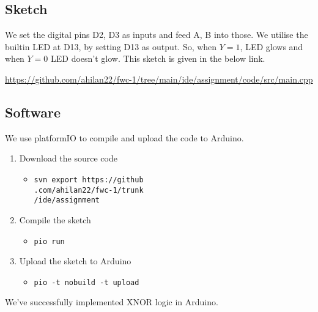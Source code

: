 \documentclass[journal,12pt,twocolumn]{IEEEtran}
\let\oldtexttt\texttt
\renewcommand{\texttt}[1]{%
	\colorbox{bgcolor}{\oldtexttt{#1}}}
\begin{document}
\subsection{Sketch}
We set the digital pins D2, D3 as inputs and feed A, B into those. We utilise the builtin LED at D13, by setting D13 as output. So, when $Y=1$, LED glows and when $Y=0$ LED doesn't glow. This sketch is given in the below link.

\bigskip

\url{https://github.com/ahilan22/fwc-1/tree/main/ide/assignment/code/src/main.cpp}

\subsection{Software}
We use platformIO to compile and upload the code to Arduino. 
\bigskip
\begin{enumerate}
	\item Download the source code%
		\begin{itemize}
			\item \texttt{svn export https://github}
				\\ \texttt{.com/ahilan22/fwc-1/trunk}
				\\ \texttt{/ide/assignment}
		\end{itemize}
	\item Compile the sketch%
		\begin{itemize}
			\item \texttt{pio run}
		\end{itemize}
	\item Upload the sketch to Arduino
		\begin{itemize}
			\item \texttt{pio -t nobuild -t upload}
		\end{itemize}
\end{enumerate}
\bigskip
We've successfully implemented XNOR logic in Arduino.
\end{document}
